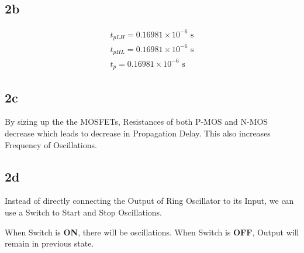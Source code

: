 \documentclass{article}
\begin{document}
\subsection{2b}
\begin{align}
    t_{pLH} = 0.16981 \times 10^{-6} \text{ s}\\
    t_{pHL} = 0.16981 \times 10^{-6} \text{ s} \\
    t_{p} = 0.16981 \times 10^{-6} \text{ s}
\end{align}

\subsection{2c}
By sizing up the the MOSFETs, Resistances of both P-MOS and N-MOS decrease which leads to decrease in Propagation Delay. This also increases Frequency of Oscillations.

\subsection{2d}
\qquad Instead of directly connecting the Output of Ring Oscillator to its Input, we can use a Switch to Start and Stop Oscillations.

\qquad When Switch is \textbf{ON}, there will be oscillations. When Switch is \textbf{OFF}, Output will remain in previous state. 
\end{document}
